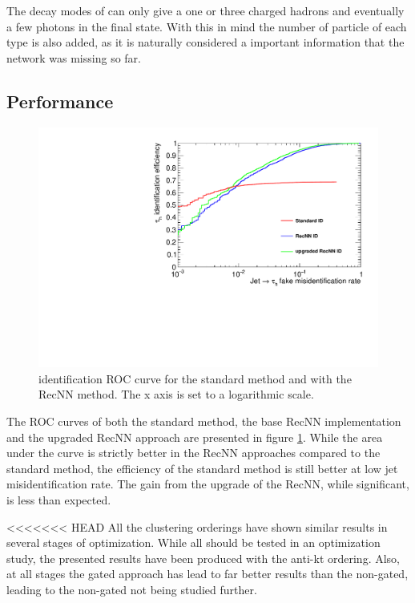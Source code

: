 The decay modes of \tauh can only give a one or three charged hadrons and eventually a few photons in the final state. With this in mind the number of particle of each type is also added, as it is naturally considered a important information that the network was missing so far.

\subsection{Performance}

\begin{figure}
    \centering
    \includegraphics[width=\textwidth]{Images/ROC_comp_all.pdf}
    \caption{\tauh identification ROC curve for the standard method and with the RecNN method. The x axis is set to a logarithmic scale.}
    \label{fig:RecNN_ROC}
\end{figure}

The ROC curves of both the standard method, the base RecNN implementation and the upgraded RecNN approach are presented in figure \ref{fig:RecNN_ROC}. While the area under the curve is strictly better in the RecNN approaches compared to the standard method, the efficiency of the standard method is still better at low jet misidentification rate. The gain from the upgrade of the RecNN, while significant, is less than expected. 

<<<<<<< HEAD
All the clustering orderings have shown similar results in several stages of optimization. While all should be tested in an optimization study, the presented results have been produced with the anti-kt ordering. Also, at all stages the gated approach has lead to far better results than the non-gated, leading to the non-gated not being studied further.

